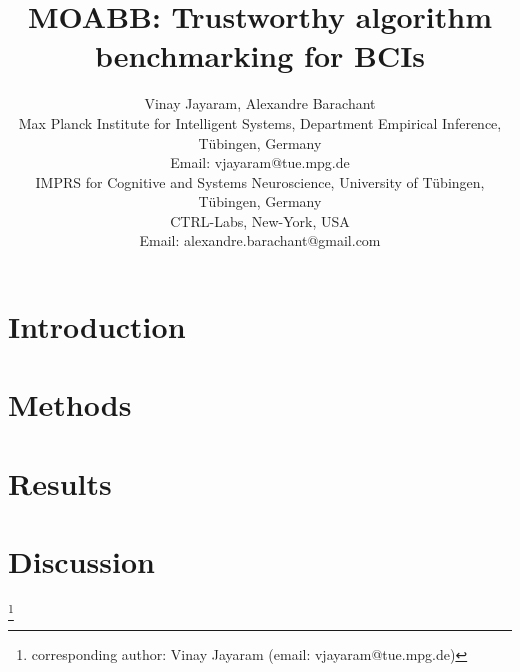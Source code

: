 \documentclass[journal]{IEEEtran}
\title{MOABB: Trustworthy algorithm benchmarking for BCIs}
\author{
  \IEEEauthorblockN
  {
    Vinay Jayaram\IEEEauthorrefmark{1}\IEEEauthorrefmark{2},
    Alexandre Barachant\IEEEauthorrefmark{3}
  }

  \IEEEauthorblockA
  {
    \IEEEauthorrefmark{1}
    Max Planck Institute for Intelligent Systems, 
    Department Empirical Inference, 
    T\"{u}bingen, Germany \\
    Email: vjayaram@tue.mpg.de}
  
  \IEEEauthorblockA
  {
    \IEEEauthorrefmark{2}
    IMPRS for Cognitive and Systems Neuroscience, 
    University of T\"{u}bingen, 
    T\"{u}bingen, Germany \\
  }
  \IEEEauthorblockA
  {
    \IEEEauthorrefmark{3}
    CTRL-Labs,
    New-York, USA \\
    Email: alexandre.barachant@gmail.com
  }
}
\newcommand\blfootnote[1]{%
  \begingroup
  \renewcommand\thefootnote{}\footnote{#1}%
  \addtocounter{footnote}{-1}%
  \endgroup
}
\begin{document}
\maketitle
\begin{abstract}
  
\end{abstract}
\section{Introduction}

\section{Methods}

\section{Results}

\section{Discussion}



\blfootnote{corresponding author: Vinay Jayaram (email: vjayaram@tue.mpg.de)}
\end{document}
